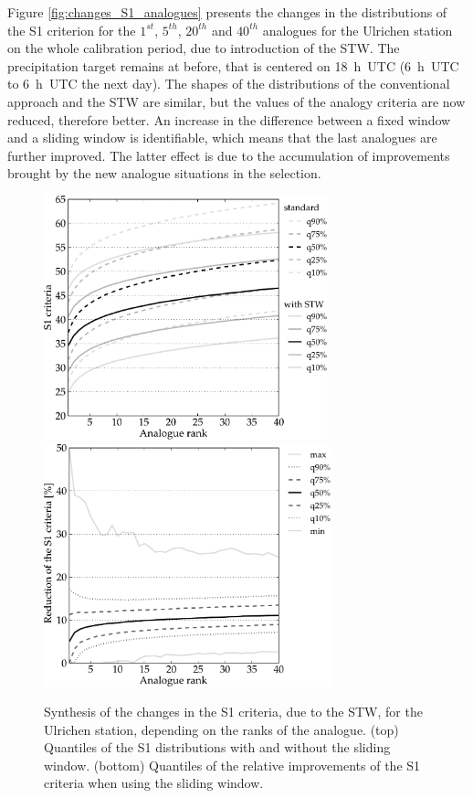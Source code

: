 \documentclass[hess]{copernicus}
\begin{document}
Figure \ref{fig:changes_S1_analogues} presents the changes in the distributions of the S1 criterion for the $1^{st}$, $5^{th}$, $20^{th}$ and $40^{th}$ analogues for the Ulrichen station on the whole calibration period, due to introduction of the STW. The precipitation target remains at before, that is centered on 18~h~UTC (6~h~UTC to 6~h~UTC the next day). The shapes of the distributions of the conventional approach and the STW are similar, but the values of the analogy criteria are now reduced, therefore better. An increase in the difference between a fixed window and a sliding window is identifiable, which means that the last analogues are further improved. The latter effect is due to the accumulation of improvements brought by the new analogue situations in the selection.

\begin{figure}[htb]
	\begin{center}
		\includegraphics[width=8.2cm]{figures/changes_S1_value.pdf} \\
		\includegraphics[width=8.3cm]{figures/changes_S1_gain.pdf}
	\end{center}
	\caption{Synthesis of the changes in the S1 criteria, due to the STW, for the Ulrichen station, depending on the ranks of the analogue. (top) Quantiles of the S1 distributions with and without the sliding window. (bottom) Quantiles of the relative improvements of the S1 criteria when using the sliding window.}
	\label{fig:changes_S1}
\end{figure}
\end{document}
